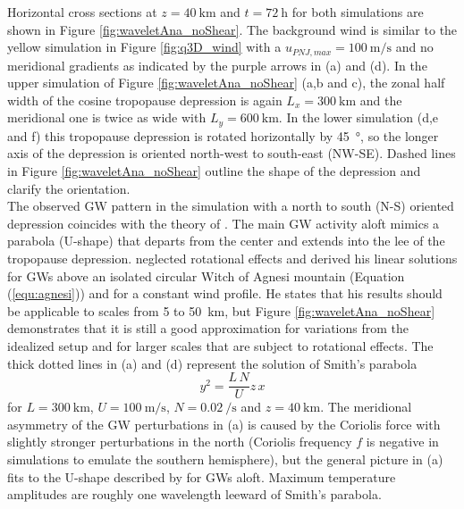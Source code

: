 Horizontal cross sections at $z=\SI{40}{\kilo\meter}$ and $t=\SI{72}{\hour}$ for both simulations are shown in Figure \ref{fig:waveletAna_noShear}. The background wind is similar to the yellow simulation in Figure \ref{fig:q3D_wind} with a $u_{PNJ,max}=\SI{100}{\meter\per\second}$ and no meridional gradients as indicated by the purple arrows in (a) and (d). In the upper simulation of Figure \ref{fig:waveletAna_noShear} (a,b and c), the zonal half width of the cosine tropopause depression is again $L_x=\SI{300}{\kilo\meter}$ and the meridional one is twice as wide with $L_y=\SI{600}{\kilo\meter}$. In the lower simulation (d,e and f) this tropopause depression is rotated horizontally by \SI{45}{\degree}, so the longer axis of the depression is oriented north-west to south-east (NW-SE). Dashed lines in Figure \ref{fig:waveletAna_noShear} outline the shape of the depression and clarify the orientation. \\
The observed GW pattern in the simulation with a north to south (N-S) oriented depression coincides with the theory of \textcite[]{smith_linear_1980}. The main GW activity aloft mimics a parabola (U-shape) that departs from the center and extends into the lee of the tropopause depression. \textcite[]{smith_linear_1980} neglected rotational effects and derived his linear solutions for GWs above an isolated circular Witch of Agnesi mountain (Equation (\ref{equ:agnesi})) and for a constant wind profile. He states that his results should be applicable to scales from 5 to \SI{50}{\kilo\meter}, but Figure \ref{fig:waveletAna_noShear} demonstrates that it is still a good approximation for variations from the idealized setup and for larger scales that are subject to rotational effects. The thick dotted lines in (a) and (d) represent the solution of Smith's parabola
\begin{equation}
    y^2 = \frac{L \, N}{U} z \, x
    \label{equ:smith_parabola}
\end{equation}
for $L=\SI{300}{\kilo\meter}$, $U=\SI{100}{\meter\per\second}$, $N=\SI{0.02}{\per\second}$ and $z=\SI{40}{\kilo\meter}$. The meridional asymmetry of the GW perturbations in (a) is caused by the Coriolis force with slightly stronger perturbations in the north (Coriolis frequency $f$ is negative in simulations to emulate the southern hemisphere), but the general picture in (a) fits to the U-shape described by \textcite[]{smith_linear_1980} for GWs aloft. Maximum temperature amplitudes are roughly one wavelength leeward of Smith's parabola. \\
